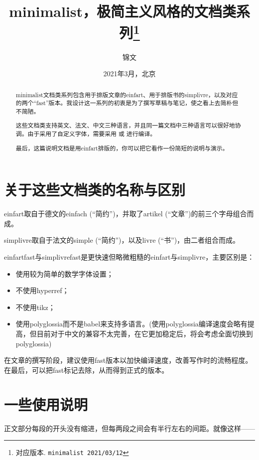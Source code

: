 \documentclass{einfart}
\providecommand{\minimalist}{\textsf{minimalist}}
\providecommand{\einfart}{\textsf{einfart}}
\providecommand{\einfartfast}{\textsf{einfartfast}}
\providecommand{\simplivre}{\textsf{simplivre}}
\providecommand{\simplivrefast}{\textsf{simplivrefast}}
\begin{document}
\title{\minimalist{}，极简主义风格的文档类系列\thanks{对应版本. \texttt{\minimalist{} 2021/03/12}}}
\author{锦文}
\date{2021年3月，北京}

\maketitle

\begin{abstract}
    \minimalist{}文档类系列包含用于排版文章的\einfart{}、用于排版书的\simplivre{}，以及对应的两个“fast”版本。我设计这一系列的初衷是为了撰写草稿与笔记，使之看上去简朴但不简陋。

    这些文档类支持英文、法文、中文三种语言，并且同一篇文档中三种语言可以很好地协调。由于采用了自定义字体，需要采用  或  进行编译。
    
    最后，这篇说明文档是用\einfart{}排版的，你可以把它看作一份简短的说明与演示。
\end{abstract}

\tableofcontents

\section{关于这些文档类的名称与区别}
\einfart{}取自于德文的einfach (“简约”)，并取了artikel (“文章”)的前三个字母组合而成。

\simplivre{}取自于法文的simple (“简约”)，以及livre (“书”)，由二者组合而成。

\einfartfast{}与\simplivrefast{}是更快速但略微粗糙的\einfart{}与\simplivre{}，主要区别是：
\begin{itemize}
    \item 使用较为简单的数学字体设置；
    \item 不使用hyperref；
    \item 不使用tikz；
    \item 使用polyglossia而不是babel来支持多语言。(使用polyglossia编译速度会略有提高，但目前对于中文的兼容不太完善，在它更加稳定后，将会考虑全面切换到polyglossia)
\end{itemize}

在文章的撰写阶段，建议使用fast版本以加快编译速度，改善写作时的流畅程度。在最后，可以把fast标记去除，从而得到正式的版本。

\section{一些使用说明}

正文部分每段的开头没有缩进，但每两段之间会有半行左右的间距。就像这样——
\end{document}
